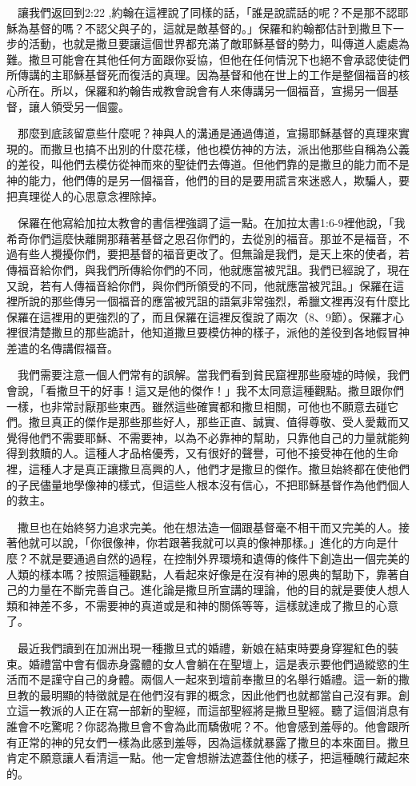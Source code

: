\documentclass{book}
\begin{document}
　讓我們返回到2:22 ,約翰在這裡說了同樣的話，「誰是說謊話的呢？不是那不認耶穌為基督的嗎？不認父與子的，這就是敵基督的。」保羅和約翰都估計到撒旦下一步的活動，也就是撒旦要讓這個世界都充滿了敵耶穌基督的勢力，叫傳道人處處為難。撒旦可能會在其他任何方面跟你妥協，但他在任何情況下也絕不會承認使徒們所傳講的主耶穌基督死而復活的真理。因為基督和他在世上的工作是整個福音的核心所在。所以，保羅和約翰告戒教會說會有人來傳講另一個福音，宣揚另一個基督，讓人領受另一個靈。

　那麼到底該留意些什麼呢？神與人的溝通是通過傳道，宣揚耶穌基督的真理來實現的。而撒旦也搞不出別的什麼花樣，他也模仿神的方法，派出他那些自稱為公義的差役，叫他們去模仿從神而來的聖徒們去傳道。但他們靠的是撒旦的能力而不是神的能力，他們傳的是另一個福音，他們的目的是要用謊言來迷惑人，欺騙人，要把真理從人的心思意念裡除掉。

　保羅在他寫給加拉太教會的書信裡強調了這一點。在加拉太書1:6-9裡他說，「我希奇你們這麼快離開那藉著基督之恩召你們的，去從別的福音。那並不是福音，不過有些人攪擾你們，要把基督的福音更改了。但無論是我們，是天上來的使者，若傳福音給你們，與我們所傳給你們的不同，他就應當被咒詛。我們已經說了，現在又說，若有人傳福音給你們，與你們所領受的不同，他就應當被咒詛。」保羅在這裡所說的那些傳另一個福音的應當被咒詛的語氣非常強烈，希臘文裡再沒有什麼比保羅在這裡用的更強烈的了，而且保羅在這裡反復說了兩次（8、9節）。保羅才心裡很清楚撒旦的那些詭計，他知道撒旦要模仿神的樣子，派他的差役到各地假冒神差遣的名傳講假福音。

　我們需要注意一個人們常有的誤解。當我們看到貧民窟裡那些廢墟的時候，我們會說，「看撒旦干的好事！這又是他的傑作！」我不太同意這種觀點。撒旦跟你們一樣，也非常討厭那些東西。雖然這些確實都和撒旦相關，可他也不願意去碰它們。撒旦真正的傑作是那些那些好人，那些正直、誠實、值得尊敬、受人愛戴而又覺得他們不需要耶穌、不需要神，以為不必靠神的幫助，只靠他自己的力量就能夠得到救贖的人。這種人才品格優秀，又有很好的聲譽，可他不接受神在他的生命裡，這種人才是真正讓撒旦高興的人，他們才是撒旦的傑作。撒旦始終都在使他們的子民儘量地學像神的樣式，但這些人根本沒有信心，不把耶穌基督作為他們個人的救主。

　撒旦也在始終努力追求完美。他在想法造一個跟基督毫不相干而又完美的人。接著他就可以說，「你很像神，你若跟著我就可以真的像神那樣。」進化的方向是什麼？不就是要通過自然的過程，在控制外界環境和遺傳的條件下創造出一個完美的人類的樣本嗎？按照這種觀點，人看起來好像是在沒有神的恩典的幫助下，靠著自己的力量在不斷完善自己。進化論是撒旦所宣講的理論，他的目的就是要使人想人類和神差不多，不需要神的真道或是和神的關係等等，這樣就達成了撒旦的心意了。

　最近我們讀到在加洲出現一種撒旦式的婚禮，新娘在結束時要身穿猩紅色的裝束。婚禮當中會有個赤身露體的女人會躺在在聖壇上，這是表示要他們過縱慾的生活而不是謹守自己的身體。兩個人一起來到壇前奉撒旦的名舉行婚禮。這一新的撒旦教的最明顯的特徵就是在他們沒有罪的概念，因此他們也就都當自己沒有罪。創立這一教派的人正在寫一部新的聖經，而這部聖經將是撒旦聖經。聽了這個消息有誰會不吃驚呢？你認為撒旦會不會為此而驕傲呢？不。他會感到羞辱的。他會跟所有正常的神的兒女們一樣為此感到羞辱，因為這樣就暴露了撒旦的本來面目。撒旦肯定不願意讓人看清這一點。他一定會想辦法遮蓋住他的樣子，把這種醜行藏起來的。
\end{document}
